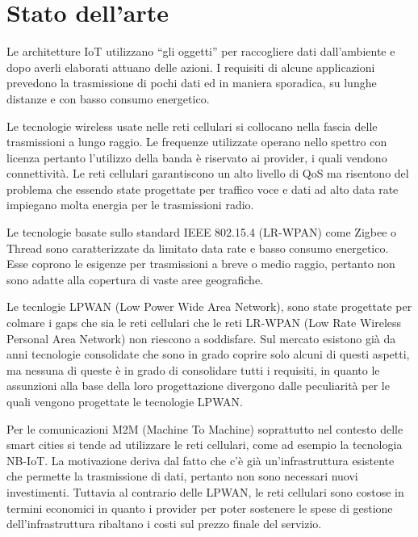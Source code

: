 \documentclass[12pt,a4paper,openright,twoside]{report}
\begin{document}
\part{Stato dell'arte}
 
\lhead[\fancyplain{}{\bfseries\thepage}]{\fancyplain{}{\bfseries\rightmark}}
Le architetture IoT utilizzano ``gli oggetti'' per raccogliere dati dall'ambiente e dopo averli elaborati attuano delle azioni.
I requisiti di alcune applicazioni prevedono la trasmissione di pochi dati ed in maniera sporadica, su lunghe distanze e con basso consumo energetico. 

Le tecnologie wireless usate nelle reti cellulari si collocano nella fascia delle trasmissioni a lungo raggio. Le frequenze utilizzate operano nello spettro con licenza pertanto l'utilizzo della banda \`e riservato ai provider, i quali vendono connettivit\`a. Le reti cellulari garantiscono un alto livello di QoS ma risentono del  problema che essendo state progettate per traffico voce e dati ad alto data rate impiegano molta energia per le trasmissioni radio.

Le tecnologie basate sullo standard IEEE 802.15.4 (LR-WPAN) come Zigbee o Thread sono caratterizzate da limitato data rate e basso consumo energetico.
Esse coprono le esigenze per trasmissioni a breve o medio raggio, pertanto  non sono adatte alla copertura di vaste aree geografiche.

Le tecnlogie LPWAN (Low Power Wide Area Network), sono state progettate per colmare i gaps che sia le reti cellulari che le reti LR-WPAN (Low Rate Wireless Personal Area Network) non riescono a soddisfare.
Sul mercato esistono gi\`a da anni tecnologie consolidate che sono in grado coprire solo alcuni di questi aspetti, ma nessuna di queste \`e in grado di consolidare tutti i requisiti, in quanto le assunzioni alla base della loro progettazione divergono dalle peculiarit\`a per le quali vengono progettate le tecnologie LPWAN.


Per le comunicazioni M2M (Machine To Machine) soprattutto nel contesto delle smart cities si tende ad utilizzare le reti cellulari, come ad esempio la tecnologia NB-IoT. 
La motivazione deriva dal fatto che c'\`e gi\`a un'infrastruttura esistente che permette la trasmissione di dati, pertanto non sono necessari nuovi investimenti. 
Tuttavia al contrario delle LPWAN, le reti cellulari sono costose in termini economici in quanto i provider per poter sostenere le spese di gestione dell'infrastruttura ribaltano i costi sul prezzo finale del servizio.
\end{document}

